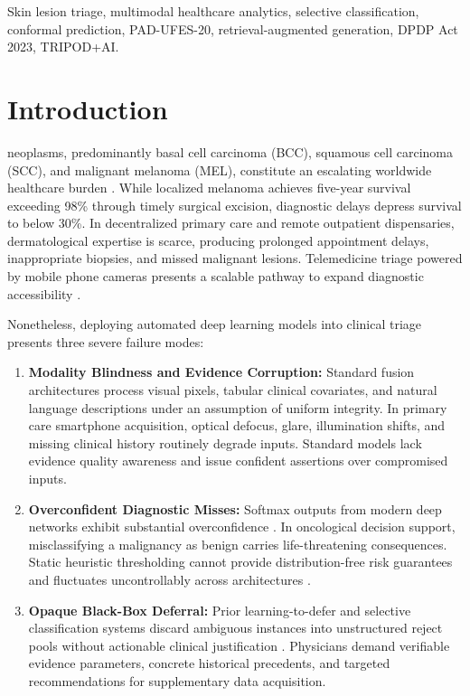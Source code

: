 \documentclass[conference]{IEEEtran}
\begin{document}
\begin{IEEEkeywords}
Skin lesion triage, multimodal healthcare analytics, selective classification, conformal prediction, PAD-UFES-20, retrieval-augmented generation, DPDP Act 2023, TRIPOD+AI.
\end{IEEEkeywords}

\section{Introduction}
 neoplasms, predominantly basal cell carcinoma (BCC), squamous cell carcinoma (SCC), and malignant melanoma (MEL), constitute an escalating worldwide healthcare burden \cite{esteva2017dermatologist}. While localized melanoma achieves five-year survival exceeding 98\% through timely surgical excision, diagnostic delays depress survival to below 30\%. In decentralized primary care and remote outpatient dispensaries, dermatological expertise is scarce, producing prolonged appointment delays, inappropriate biopsies, and missed malignant lesions. Telemedicine triage powered by mobile phone cameras presents a scalable pathway to expand diagnostic accessibility \cite{pacheco2020pad}.

Nonetheless, deploying automated deep learning models into clinical triage presents three severe failure modes:
\begin{enumerate}
    \item \textbf{Modality Blindness and Evidence Corruption:} Standard fusion architectures process visual pixels, tabular clinical covariates, and natural language descriptions under an assumption of uniform integrity. In primary care smartphone acquisition, optical defocus, glare, illumination shifts, and missing clinical history routinely degrade inputs. Standard models lack evidence quality awareness and issue confident assertions over compromised inputs.
    \item \textbf{Overconfident Diagnostic Misses:} Softmax outputs from modern deep networks exhibit substantial overconfidence \cite{guo2017calibration}. In oncological decision support, misclassifying a malignancy as benign carries life-threatening consequences. Static heuristic thresholding cannot provide distribution-free risk guarantees and fluctuates uncontrollably across architectures \cite{geifman2017selective}.
    \item \textbf{Opaque Black-Box Deferral:} Prior learning-to-defer and selective classification systems discard ambiguous instances into unstructured reject pools without actionable clinical justification \cite{mozannar2020consistent, chow1970optimum}. Physicians demand verifiable evidence parameters, concrete historical precedents, and targeted recommendations for supplementary data acquisition.
\end{enumerate}
\end{document}
